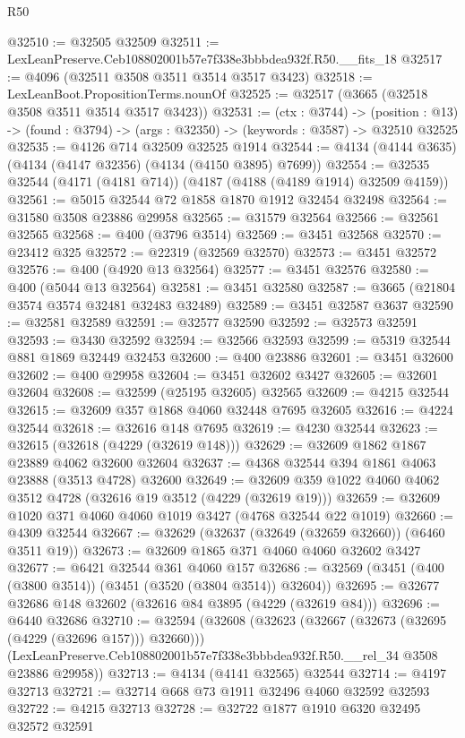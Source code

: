 \begin{lexlean}{R50}
\begin{coremodule}
@32510 := @32505 @32509
@32511 := LexLeanPreserve.Ceb108802001b57e7f338e3bbbdea932f.R50.__fits_18
@32517 := @4096 (@32511 @3508 @3511 @3514 @3517 @3423)
@32518 := LexLeanBoot.PropositionTerms.nounOf
@32525 := @32517 (@3665 (@32518 @3508 @3511 @3514 @3517 @3423))
@32531 := (ctx : @3744) ->
  (position : @13) -> (found : @3794) -> (args : @32350) -> (keywords : @3587) -> @32510 @32525
@32535 := @4126 @714 @32509 @32525 @1914
@32544 := @4134 (@4144 @3635) (@4134 (@4147 @32356) (@4134 (@4150 @3895) @7699))
@32554 := @32535 @32544 (@4171 (@4181 @714)) (@4187 (@4188 (@4189 @1914) @32509 @4159))
@32561 := @5015 @32544 @72 @1858 @1870 @1912 @32454 @32498
@32564 := @31580 @3508 @23886 @29958
@32565 := @31579 @32564
@32566 := @32561 @32565
@32568 := @400 (@3796 @3514)
@32569 := @3451 @32568
@32570 := @23412 @325
@32572 := @22319 (@32569 @32570)
@32573 := @3451 @32572
@32576 := @400 (@4920 @13 @32564)
@32577 := @3451 @32576
@32580 := @400 (@5044 @13 @32564)
@32581 := @3451 @32580
@32587 := @3665 (@21804 @3574 @3574 @32481 @32483 @32489)
@32589 := @3451 @32587 @3637
@32590 := @32581 @32589
@32591 := @32577 @32590
@32592 := @32573 @32591
@32593 := @3430 @32592
@32594 := @32566 @32593
@32599 := @5319 @32544 @881 @1869 @32449 @32453
@32600 := @400 @23886
@32601 := @3451 @32600
@32602 := @400 @29958
@32604 := @3451 @32602 @3427
@32605 := @32601 @32604
@32608 := @32599 (@25195 @32605) @32565
@32609 := @4215 @32544
@32615 := @32609 @357 @1868 @4060 @32448 @7695 @32605
@32616 := @4224 @32544
@32618 := @32616 @148 @7695
@32619 := @4230 @32544
@32623 := @32615 (@32618 (@4229 (@32619 @148)))
@32629 := @32609 @1862 @1867 @23889 @4062 @32600 @32604
@32637 := @4368 @32544 @394 @1861 @4063 @23888 (@3513 @4728) @32600
@32649 := @32609 @359 @1022 @4060 @4062 @3512 @4728 (@32616 @19 @3512 (@4229 (@32619 @19)))
@32659 := @32609 @1020 @371 @4060 @4060 @1019 @3427 (@4768 @32544 @22 @1019)
@32660 := @4309 @32544
@32667 := @32629 (@32637 (@32649 (@32659 @32660)) (@6460 @3511 @19))
@32673 := @32609 @1865 @371 @4060 @4060 @32602 @3427
@32677 := @6421 @32544 @361 @4060 @157
@32686 := @32569 (@3451 (@400 (@3800 @3514)) (@3451 (@3520 (@3804 @3514)) @32604))
@32695 := @32677 @32686 @148 @32602 (@32616 @84 @3895 (@4229 (@32619 @84)))
@32696 := @6440 @32686
@32710 := @32594
    (@32608
      (@32623 (@32667 (@32673 (@32695 (@4229 (@32696 @157))) @32660)))
      (LexLeanPreserve.Ceb108802001b57e7f338e3bbbdea932f.R50.__rel_34 @3508 @23886 @29958))
@32713 := @4134 (@4141 @32565) @32544
@32714 := @4197 @32713
@32721 := @32714 @668 @73 @1911 @32496 @4060 @32592 @32593
@32722 := @4215 @32713
@32728 := @32722 @1877 @1910 @6320 @32495 @32572 @32591

\end{coremodule}
\end{lexlean}
